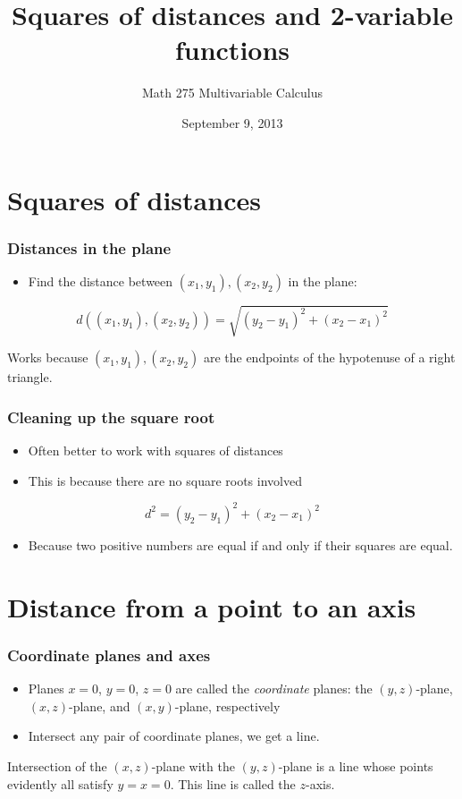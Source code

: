 \documentclass[11pt,ignorenonframetext,aspectratio=169]{beamer}
\title{Squares of distances and 2-variable functions}
\author{Math 275 Multivariable Calculus}
\date{September 9, 2013 }
\begin{document}
\frame{\titlepage}

\section{Squares of distances}

\begin{frame}\frametitle{Distances in the plane}

\begin{itemize}[<+->]

\item
  Find the distance between $(x_1, y_1), (x_2, y_2)$ in the plane:
\end{itemize}

\[ d((x_1, y_1), (x_2, y_2)) = \sqrt{(y_2 - y_1)^2 + (x_2 - x_1)^2} \]

Works because $(x_1, y_1), (x_2, y_2)$ are the endpoints of the
hypotenuse of a right triangle.

\end{frame}

\begin{frame}\frametitle{Cleaning up the square root}

\begin{itemize}[<+->]
\item
  Often better to work with squares of distances
\item
  This is because there are no square roots involved
\end{itemize}

\[ d^2 = (y_2 - y_1)^2 + (x_2 - x_1)^2 \]

\begin{itemize}[<+->]

\item
  Because two positive numbers are equal if and only if their squares
  are equal.
\end{itemize}

\end{frame}

\section{Distance from a point to an axis}

\begin{frame}\frametitle{Coordinate planes and axes}

\begin{itemize}[<+->]
\item
  Planes $x = 0$, $y = 0$, $z = 0$ are called the \emph{coordinate}
  planes: the $(y,z)$-plane, $(x,z)$-plane, and $(x,y)$-plane,
  respectively
\item
  Intersect any pair of coordinate planes, we get a line.
\end{itemize}

Intersection of the $(x,z)$-plane with the $(y,z)$-plane is a line whose
points evidently all satisfy $y = x = 0$. This line is called the
$z$-axis.

\end{frame}
\end{document}
